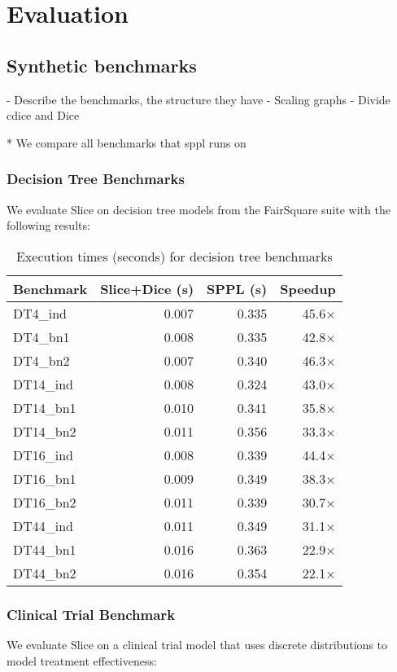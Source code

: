 \section{Evaluation}\label{sec:evaluation}


\subsection{Synthetic benchmarks}\label{sec:synthetic-benchmarks}
- Describe the benchmarks, the structure they have
- Scaling graphs
- Divide cdice and Dice

* We compare all benchmarks that sppl runs on

\subsubsection{Decision Tree Benchmarks}
We evaluate Slice on decision tree models from the FairSquare suite with the following results:

\begin{table}[!t]
\centering
\begin{tabular}{lrrr}
\toprule
Benchmark & Slice+Dice (s) & SPPL (s) & Speedup \\
\midrule
DT4\_ind & 0.007 & 0.335 & 45.6× \\
DT4\_bn1 & 0.008 & 0.335 & 42.8× \\
DT4\_bn2 & 0.007 & 0.340 & 46.3× \\
DT14\_ind & 0.008 & 0.324 & 43.0× \\
DT14\_bn1 & 0.010 & 0.341 & 35.8× \\
DT14\_bn2 & 0.011 & 0.356 & 33.3× \\
DT16\_ind & 0.008 & 0.339 & 44.4× \\
DT16\_bn1 & 0.009 & 0.349 & 38.3× \\
DT16\_bn2 & 0.011 & 0.339 & 30.7× \\
DT44\_ind & 0.011 & 0.349 & 31.1× \\
DT44\_bn1 & 0.016 & 0.363 & 22.9× \\
DT44\_bn2 & 0.016 & 0.354 & 22.1× \\
\bottomrule
\end{tabular}
\caption{Execution times (seconds) for decision tree benchmarks}
\end{table}

\subsubsection{Clinical Trial Benchmark}
We evaluate Slice on a clinical trial model that uses discrete distributions to model treatment effectiveness:

